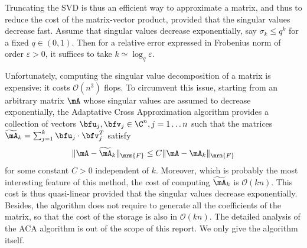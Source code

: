 Truncating the SVD is thus an efficient way to approximate a matrix, and thus to reduce the cost of the 
matrix-vector product, provided that  the singular values decrease fast. Assume that singular values decrease 
exponentially, say $\sigma_{k}\leq q^{k}$ for a fixed $q\in (0,1)$. Then for a relative error expressed in Frobenius norm of order $\varepsilon>0$,  
it suffices to take $k \simeq \log_q \varepsilon$. 

\bigskip
Unfortunately, computing the singular value decomposition  of a matrix is expensive: it costs $\mathcal{O}(n^{3})$ flops. To circumvent this issue, starting from 
an arbitrary matrix $\mA$ whose singular values are assumed to decrease exponentially, the Adaptative 
Cross Approximation algorithm provides a collection of vectors $\bfu_{j},\bfv_{j}\in \C^{n}, j=1\dots n$ such that 
the matrices $\widetilde{\mA}_{k} = \sum_{j=1}^{k}\bfu_{j}\cdot\bfv_{j}^{T}$ satisfy 
\[
\Vert \mA - \widetilde{\mA}_{k}\Vert_{\mrm{F}}\leq C \Vert \mA - \mA_{k}\Vert_{\mrm{F}}
\]
for some constant $C>0$ independent of $k$. Moreover, which is probably the most interesting feature of this method, 
the cost of computing $\widetilde{\mA}_{k}$ is $\mathcal{O}(kn)$. This cost is thus quasi-linear provided that the singular 
values  decrease exponentially. Besides, the algorithm does not require to generate all the coefficients of the matrix, so that the cost of the storage is also in $\mathcal{O}(kn)$. The detailed analysis of the ACA algorithm is out of the scope of this report. We only 
give the algorithm itself.

